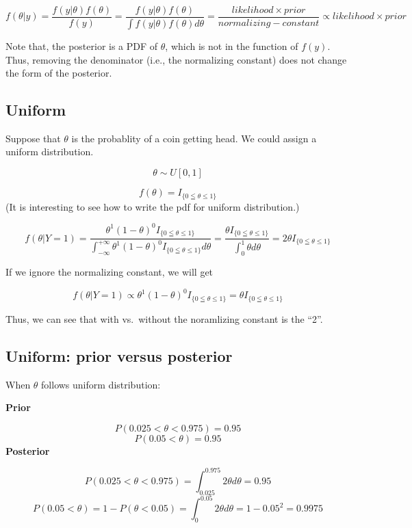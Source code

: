 \documentclass[]{book}
\begin{document}
\[f(\theta |y)=\frac{f(y|\theta) f(\theta)}{f(y)}=\frac{f(y|\theta) f(\theta)}{\int f(y|\theta)f(\theta)d\theta}=\frac{likelihood \times prior}{normalizing-constant} \propto likelihood \times prior\]

Note that, the posterior is a PDF of \(\theta\), which is not in the function of \(f(y)\). Thus, removing the denominator (i.e., the normalizing constant) does not change the form of the posterior.

\hypertarget{uniform}{%
\subsection{Uniform}\label{uniform}}

Suppose that \(\theta\) is the probablity of a coin getting head. We could assign a uniform distribution.

\[\theta \sim U[0,1]\]

\[f(\theta)=I_{ \{0 \leqq \theta \leqslant 1 \}}\]
(It is interesting to see how to write the pdf for uniform distribution.)

\[f(\theta | Y=1)= \frac{\theta^1(1-\theta)^0 I_{\{0 \leqq \theta \leqslant 1\}}}{\int_{-\infty}^{+\infty} \theta^1(1-\theta)^0 I_{\{0 \leqq \theta \leqslant 1\}} d\theta}=\frac{\theta I_{\{0 \leqq \theta \leqslant 1 \}}}{\int_0^1 \theta d\theta}=2\theta I_{ \{0 \leqq \theta \leqslant 1\}}\]

If we ignore the normalizing constant, we will get

\[f(\theta | Y=1) \propto \theta^1(1-\theta)^0 I_{ \{0 \leqq \theta \leqslant 1\} }=\theta I_{ \{0 \leqq \theta \leqslant 1\} }\]

Thus, we can see that with vs.~without the noramlizing constant is the ``2''.

\hypertarget{uniform-prior-versus-posterior}{%
\subsection{Uniform: prior versus posterior}\label{uniform-prior-versus-posterior}}

When \(\theta\) follows uniform distribution:

\textbf{Prior}

\[P(0.025 <\theta<0.975)=0.95\]
\[P( 0.05< \theta )=0.95\]
\textbf{Posterior}

\[P(0.025<\theta<0.975)=\int_{0.025}^{0.975} 2\theta d\theta=0.95\]
\[P(0.05<\theta)=1-P(\theta <0.05)=\int_{0}^{0.05} 2\theta d\theta=1-0.05^2=0.9975\]
\end{document}
